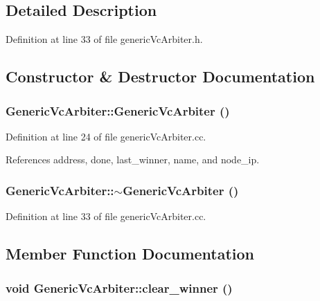 \subsection{Detailed Description}


Definition at line 33 of file genericVcArbiter.h.

\subsection{Constructor \& Destructor Documentation}
\subsubsection[{GenericVcArbiter}]{\setlength{\rightskip}{0pt plus 5cm}GenericVcArbiter::GenericVcArbiter ()}\label{classGenericVcArbiter_8ad20b81e2a38303b310d15e1dcc9947}




Definition at line 24 of file genericVcArbiter.cc.

References address, done, last\_\-winner, name, and node\_\-ip.
\subsubsection[{$\sim$GenericVcArbiter}]{\setlength{\rightskip}{0pt plus 5cm}GenericVcArbiter::$\sim$GenericVcArbiter ()}\label{classGenericVcArbiter_da76ff9f227949f97ecd02d1bf89b5c8}




Definition at line 33 of file genericVcArbiter.cc.

\subsection{Member Function Documentation}
\subsubsection[{clear\_\-winner}]{\setlength{\rightskip}{0pt plus 5cm}void GenericVcArbiter::clear\_\-winner ()}\label{classGenericVcArbiter_4cd15ea7b1b8ff50cbd9148826880fdf}




